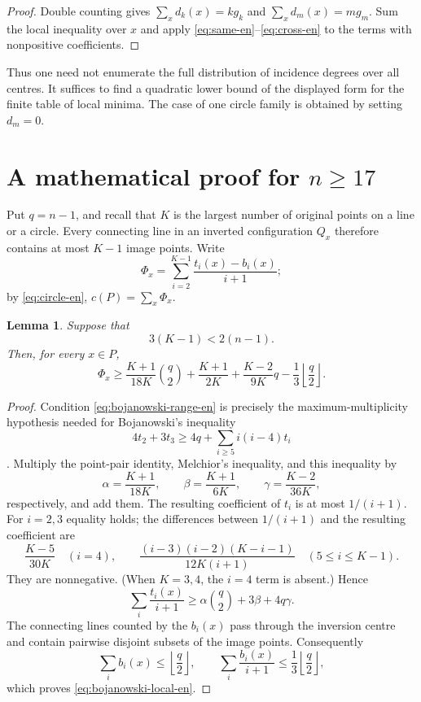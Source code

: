 \documentclass[11pt,a4paper]{article}
\newtheorem{lemma}[theorem]{Lemma}
\theoremstyle{definition}
\begin{document}
\begin{proof}
Double counting gives $\sum_xd_k(x)=kg_k$ and $\sum_xd_m(x)=mg_m$.
Sum the local inequality over $x$ and apply \eqref{eq:same-en}--\eqref{eq:cross-en}
to the terms with nonpositive coefficients.
\end{proof}

Thus one need not enumerate the full distribution of incidence degrees over all
centres.  It suffices to find a quadratic lower bound of the displayed form for the
finite table of local minima.  The case of one circle family is obtained by setting
$d_m=0$.

\section{A mathematical proof for \texorpdfstring{$n\ge17$}{n>=17}}

Put \(q=n-1\), and recall that \(K\) is the largest number of original points
on a line or a circle.  Every connecting line in an inverted configuration
\(Q_x\) therefore contains at most \(K-1\) image points.  Write
\[
 \Phi_x=\sum_{i=2}^{K-1}\frac{t_i(x)-b_i(x)}{i+1};
\]
by \eqref{eq:circle-en}, \(c(P)=\sum_x\Phi_x\).

\begin{lemma}\label{lem:bojanowski-local-en}
Suppose that
\begin{equation}\label{eq:bojanowski-range-en}
 3(K-1)<2(n-1).
\end{equation}
Then, for every \(x\in P\),
\begin{equation}\label{eq:bojanowski-local-en}
\Phi_x\ge
 \frac{K+1}{18K}\binom q2+\frac{K+1}{2K}
 +\frac{K-2}{9K}q-\frac13\left\lfloor\frac q2\right\rfloor.
\end{equation}
\end{lemma}

\begin{proof}
Condition \eqref{eq:bojanowski-range-en} is precisely the maximum-multiplicity
hypothesis needed for Bojanowski's inequality
\[
4t_2+3t_3\ge4q+\sum_{i\ge5}i(i-4)t_i
\]
\cite[Theorem~2.1]{pokora-en}.  Multiply the point-pair identity, Melchior's
inequality, and this inequality by
\[
 \alpha=\frac{K+1}{18K},\qquad
 \beta=\frac{K+1}{6K},\qquad
 \gamma=\frac{K-2}{36K},
\]
respectively, and add them.  The resulting coefficient of \(t_i\) is at most
\(1/(i+1)\).  For \(i=2,3\) equality holds; the differences between
\(1/(i+1)\) and the resulting coefficient are
\[
 \frac{K-5}{30K}\quad(i=4),\qquad
 \frac{(i-3)(i-2)(K-i-1)}{12K(i+1)}\quad(5\le i\le K-1).
\]
They are nonnegative.  (When \(K=3,4\), the \(i=4\) term is absent.)  Hence
\[
 \sum_i\frac{t_i(x)}{i+1}\ge
 \alpha\binom q2+3\beta+4q\gamma.
\]
The connecting lines counted by the \(b_i(x)\) pass through the inversion
centre and contain pairwise disjoint subsets of the image points.  Consequently
\[
 \sum_i b_i(x)\le\left\lfloor\frac q2\right\rfloor,\qquad
 \sum_i\frac{b_i(x)}{i+1}\le
 \frac13\left\lfloor\frac q2\right\rfloor,
\]
which proves \eqref{eq:bojanowski-local-en}.
\end{proof}
\end{document}

